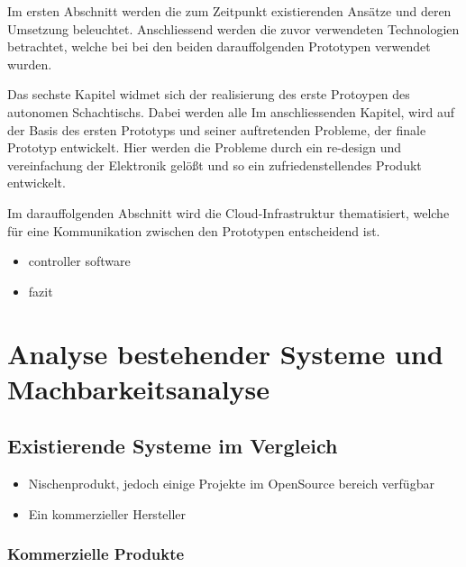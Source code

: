 Im ersten Abschnitt werden die zum Zeitpunkt existierenden Ansätze und
deren Umsetzung beleuchtet. Anschliessend werden die zuvor verwendeten
Technologien betrachtet, welche bei bei den beiden darauffolgenden
Prototypen verwendet wurden.

Das sechste Kapitel widmet sich der realisierung des erste Protoypen des
autonomen Schachtischs. Dabei werden alle Im anschliessenden Kapitel,
wird auf der Basis des ersten Prototyps und seiner auftretenden
Probleme, der finale Prototyp entwickelt. Hier werden die Probleme durch
ein re-design und vereinfachung der Elektronik gelößt und so ein
zufriedenstellendes Produkt entwickelt.

Im darauffolgenden Abschnitt wird die Cloud-Infrastruktur thematisiert,
welche für eine Kommunikation zwischen den Prototypen entscheidend ist.

\begin{itemize}
\tightlist
\item
  controller software
\item
  fazit
\end{itemize}

\hypertarget{analyse-bestehender-systeme-und-machbarkeitsanalyse}{%
\section{Analyse bestehender Systeme und
Machbarkeitsanalyse}\label{analyse-bestehender-systeme-und-machbarkeitsanalyse}}

\hypertarget{existierende-systeme-im-vergleich}{%
\subsection{Existierende Systeme im
Vergleich}\label{existierende-systeme-im-vergleich}}

\begin{itemize}
\tightlist
\item
  Nischenprodukt, jedoch einige Projekte im OpenSource bereich verfügbar
\item
  Ein kommerzieller Hersteller
\end{itemize}

\hypertarget{kommerzielle-produkte}{%
\subsubsection{Kommerzielle Produkte}\label{kommerzielle-produkte}}

